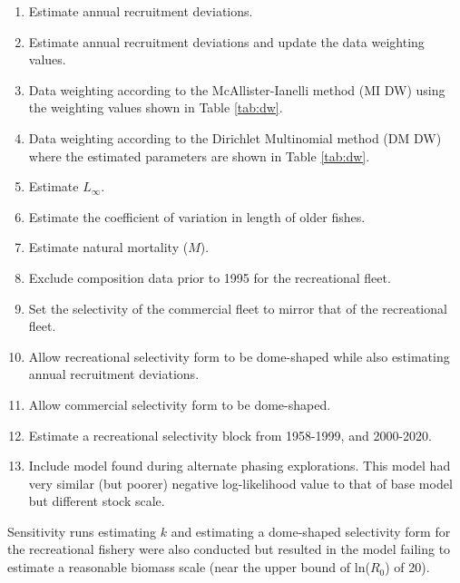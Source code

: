 \documentclass[11pt,
  english,
  letterpaper,
]{article}
\begin{document}
\begin{enumerate}
   
  \item Estimate annual recruitment deviations.
  
  \item Estimate annual recruitment deviations and update the data weighting values.

  \item Data weighting according to the McAllister-Ianelli method (MI DW) using the weighting values shown in Table \ref{tab:dw}. 
  
  \item Data weighting according to the Dirichlet Multinomial method (DM DW) where the estimated parameters are shown in Table \ref{tab:dw}. 

  \item Estimate $L_{\infty}$.

  \item Estimate the coefficient of variation in length of older fishes.

  \item Estimate natural mortality ($M$).
  
  \item Exclude composition data prior to 1995 for the recreational fleet.
  
  \item Set the selectivity of the commercial fleet to mirror that of the recreational fleet.
  
  \item Allow recreational selectivity form to be dome-shaped while also estimating annual recruitment deviations. 
  
  \item Allow commercial selectivity form to be dome-shaped.

  \item Estimate a recreational selectivity block from 1958-1999, and 2000-2020.   
  
  \item Include model found during alternate phasing explorations. This model had very similar (but poorer) negative log-likelihood value to that of base model but different stock scale.
  
\end{enumerate}


Sensitivity runs estimating {\(k\)\leavevmode\tagmcend\tagstructend} and estimating a dome-shaped selectivity form for the recreational fishery were also conducted but resulted in the model failing to estimate a reasonable biomass scale (near the upper bound of ln({\(R_0\)\leavevmode\tagmcend\tagstructend}) of 20).
\end{document}
